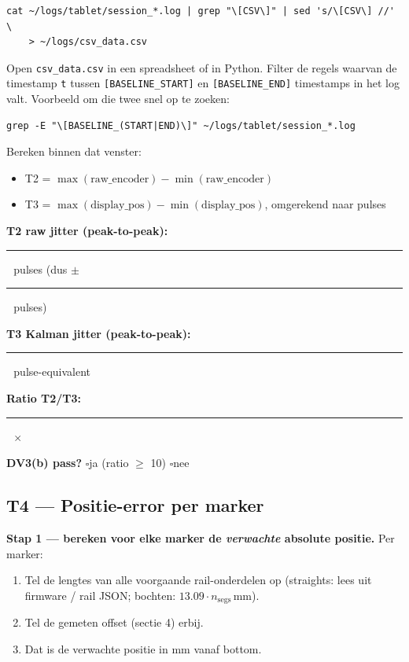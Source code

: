 \documentclass[11pt, a4paper]{article}
\newcommand{\cbox}{$\square$\;}
\newcommand{\fillshort}{\rule[-0.5ex]{2cm}{0.4pt}}
\begin{document}
\begin{lstlisting}
cat ~/logs/tablet/session_*.log | grep "\[CSV\]" | sed 's/\[CSV\] //' \
    > ~/logs/csv_data.csv
\end{lstlisting}

Open \texttt{csv\_data.csv} in een spreadsheet of in Python. Filter
de regels waarvan de timestamp \texttt{t} tussen
\texttt{[BASELINE\_START]} en \texttt{[BASELINE\_END]} timestamps in
het log valt. Voorbeeld om die twee snel op te zoeken:

\begin{lstlisting}
grep -E "\[BASELINE_(START|END)\]" ~/logs/tablet/session_*.log
\end{lstlisting}

Bereken binnen dat venster:

\begin{itemize}[leftmargin=2em]
  \item T2 = $\max(\text{raw\_encoder}) - \min(\text{raw\_encoder})$
  \item T3 = $\max(\text{display\_pos}) - \min(\text{display\_pos})$, omgerekend naar pulses
\end{itemize}

\textbf{T2 raw jitter (peak-to-peak):} \fillshort\ \,pulses (dus $\pm$\fillshort\ \,pulses)

\textbf{T3 Kalman jitter (peak-to-peak):} \fillshort\ \,pulse-equivalent

\textbf{Ratio T2/T3:} \fillshort\ \,$\times$

\textbf{DV3(b) pass?} \cbox ja (ratio $\geq$ 10)\hspace{1em} \cbox nee

\subsection{T4 — Positie-error per marker}

\textbf{Stap 1 --- bereken voor elke marker de \emph{verwachte}
absolute positie.} Per marker:

\begin{enumerate}[leftmargin=2em]
  \item Tel de lengtes van alle voorgaande rail-onderdelen op
        (straights: lees uit firmware / rail JSON; bochten:
        $13.09 \cdot n_{\text{segs}}$\,mm).
  \item Tel de gemeten offset (sectie 4) erbij.
  \item Dat is de verwachte positie in mm vanaf bottom.
\end{enumerate}
\end{document}

